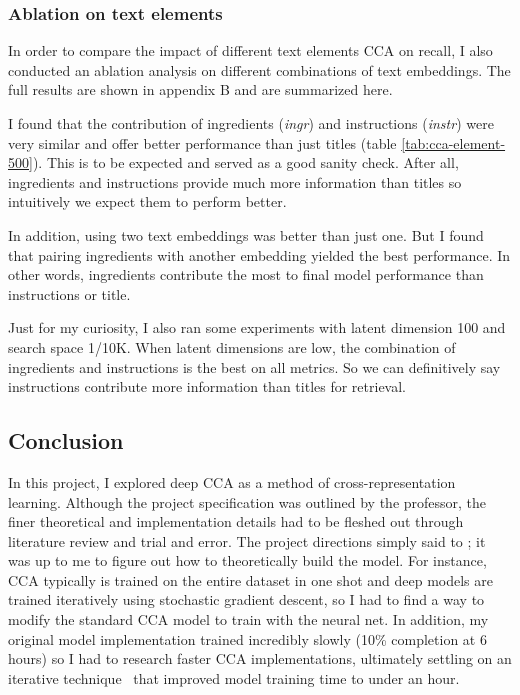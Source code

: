 \documentclass[12pt, titlepage]{article}
\begin{document}
\subsubsection{Ablation on text elements}
In order to compare the impact of different text elements CCA on recall, I also conducted an ablation analysis on different combinations of text embeddings. The full results are shown in appendix B and are summarized here.

I found that the contribution of ingredients (\textit{ingr}) and instructions (\textit{instr}) were very similar and offer better performance than just titles (table \ref{tab:cca-element-500}). This is to be expected and served as a good sanity check. After all, ingredients and instructions provide much more information than titles so intuitively we expect them to perform better.

In addition, using two text embeddings was better than just one. But I found that pairing ingredients with another embedding yielded the best performance. In other words, ingredients contribute the most to final model performance than instructions or title.

Just for my curiosity, I also ran some experiments with latent dimension 100 and search space 1/10K. When latent dimensions are low, the combination of ingredients and instructions is the best on all metrics. So we can definitively say instructions contribute more information than titles for retrieval.

\subsection{Conclusion}
In this project, I explored deep CCA as a method of cross-representation learning. Although the project specification was outlined by the professor, the finer theoretical and implementation details had to be fleshed out through literature review and trial and error. The project directions simply said to ; it was up to me to figure out how to theoretically build the model. For instance, CCA typically is trained on the entire dataset in one shot and deep models are trained iteratively using stochastic gradient descent, so I had to find a way to modify the standard CCA model to train with the neural net. In addition, my original model implementation trained incredibly slowly (10\% completion at 6 hours) so I had to research faster CCA implementations, ultimately settling on an iterative technique~\cite{Hotelling1992-jg} that improved model training time to under an hour.
\end{document}
